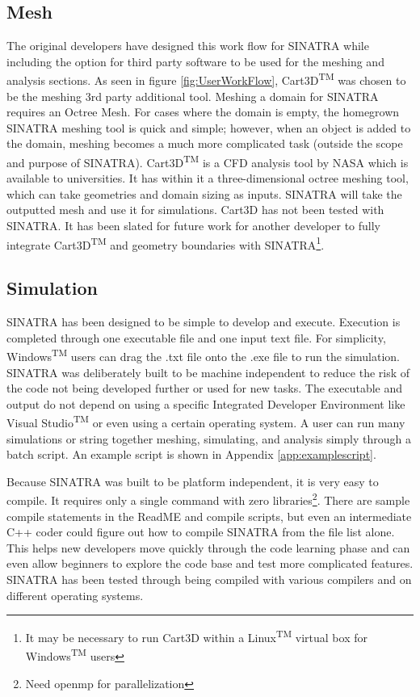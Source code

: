 \subsection{Mesh}
The original developers have designed this work flow for SINATRA while including the option for third party software to be used for the meshing and analysis sections. As seen in figure \ref{fig:UserWorkFlow}, Cart3D\textsuperscript{TM} \cite{cart3d} was chosen to be the meshing 3rd party additional tool. Meshing a domain for SINATRA requires an Octree Mesh. For cases where the domain is empty, the homegrown SINATRA meshing tool is quick and simple; however, when an object is added to the domain, meshing becomes a much more complicated task (outside the scope and purpose of SINATRA).  Cart3D\textsuperscript{TM} is a CFD analysis tool by NASA which is available to universities. It has within it a three-dimensional octree meshing tool, which can take geometries and domain sizing as inputs. SINATRA will take the outputted mesh and use it for simulations. Cart3D has not been tested with SINATRA. It has been slated for future work for another developer to fully integrate Cart3D\textsuperscript{TM} and geometry boundaries with SINATRA\footnote{It may be necessary to run Cart3D within a Linux\textsuperscript{TM} virtual box for Windows\textsuperscript{TM} users}. \par

\subsection{Simulation}

SINATRA has been designed to be simple to develop and execute. Execution is completed through one executable file and one input text file. For simplicity, Windows\textsuperscript{TM} users can drag the .txt file onto the .exe file to run the simulation. SINATRA was deliberately built to be machine independent to reduce the risk of the code not being developed further or used for new tasks. The executable and output do not depend on using a specific Integrated Developer Environment like Visual Studio\textsuperscript{TM} or even using a certain operating system. A user can run many simulations or string together meshing, simulating, and analysis simply through a batch script. An example script is shown in Appendix \ref{app:examplescript}. \par
\indent Because SINATRA was built to be platform independent, it is very easy to compile. It requires only a single command with zero libraries\footnote{Need openmp for parallelization}. There are sample compile statements in the ReadME and compile scripts, but even an intermediate C++ coder could figure out how to compile SINATRA from the file list alone. This helps new developers move quickly through the code learning phase and can even allow beginners to explore the code base and test more complicated features. SINATRA has been tested through being compiled with various compilers and on different operating systems.

